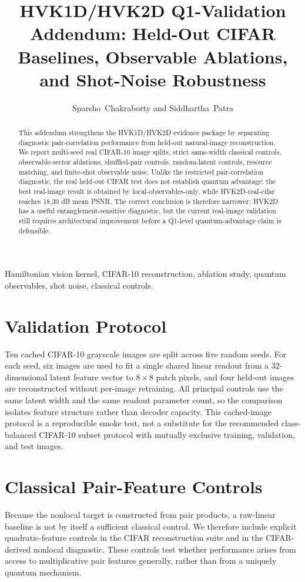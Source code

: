 \documentclass[journal]{IEEEtran}
\begin{document}
\title{HVK1D/HVK2D Q1-Validation Addendum: Held-Out CIFAR Baselines, Observable Ablations, and Shot-Noise Robustness}
\author{Sparsho~Chakraborty and Siddhartha~Patra}
\maketitle
\begin{abstract}
This addendum strengthens the HVK1D/HVK2D evidence package by separating diagnostic pair-correlation performance from held-out natural-image reconstruction. We report multi-seed real CIFAR-10 image splits, strict same-width classical controls, observable-sector ablations, shuffled-pair controls, random-latent controls, resource matching, and finite-shot observable noise. Unlike the restricted pair-correlation diagnostic, the real held-out CIFAR test does not establish quantum advantage: the best real-image result is obtained by local-observables-only, while HVK2D-real-cifar reaches 18.30 dB mean PSNR. The correct conclusion is therefore narrower: HVK2D has a useful entanglement-sensitive diagnostic, but the current real-image validation still requires architectural improvement before a Q1-level quantum-advantage claim is defensible.
\end{abstract}

\begin{IEEEkeywords}
Hamiltonian vision kernel, CIFAR-10 reconstruction, ablation study, quantum observables, shot noise, classical controls.
\end{IEEEkeywords}

\section{Validation Protocol}
Ten cached CIFAR-10 grayscale images are split across five random seeds. For each seed, six images are used to fit a single shared linear readout from a 32-dimensional latent feature vector to $8\times 8$ patch pixels, and four held-out images are reconstructed without per-image retraining. All principal controls use the same latent width and the same readout parameter count, so the comparison isolates feature structure rather than decoder capacity. This cached-image protocol is a reproducible smoke test, not a substitute for the recommended class-balanced CIFAR-10 subset protocol with mutually exclusive training, validation, and test images.

\section{Classical Pair-Feature Controls}
Because the nonlocal target is constructed from pair products, a raw-linear baseline is not by itself a sufficient classical control. We therefore include explicit quadratic-feature controls in the CIFAR reconstruction suite and in the CIFAR-derived nonlocal diagnostic. These controls test whether performance arises from access to multiplicative pair features generally, rather than from a uniquely quantum mechanism.
\end{document}
